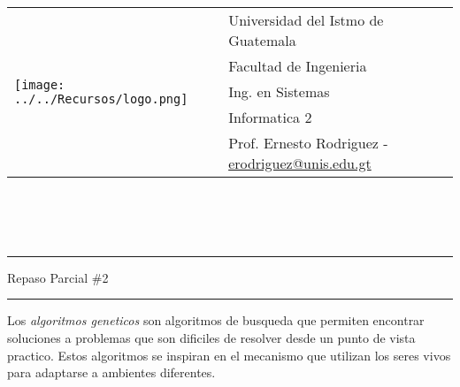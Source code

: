 \documentclass{article}
\newcommand{\horrule}[1]{\rule{\linewidth}{#1}}
\begin{document}
\begin{tabular}{l l}
\multirow{5}{*}{\texttt{[image: ../../Recursos/logo.png]}} & Universidad del Istmo de Guatemala \\
 & Facultad de Ingenieria \\
 & Ing. en Sistemas \\
 & Informatica 2 \\
 & Prof. Ernesto Rodriguez - \href{mailto:erodriguez@unis.edu.gt}{erodriguez@unis.edu.gt} \\
\end{tabular}
\\\\\\

\begin{center}
        \horrule{0.5pt}
        \huge{Repaso Parcial \#2} \\
        \horrule{1pt}
\end{center}

Los \emph{algoritmos geneticos} son algoritmos de busqueda que permiten encontrar soluciones
a problemas que son dificiles de resolver desde un punto de vista practico. Estos algoritmos
se inspiran en el mecanismo que utilizan los seres vivos para adaptarse a ambientes diferentes.
\end{document}
